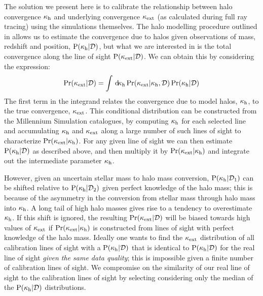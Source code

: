 \documentclass[useAMS,usenatbib]{mn2e}
\begin{document}
The solution we present here is to calibrate the relationship between halo
convergence $\kappa_{\rm h}$ and underlying convergence $\kappa_{\rm ext}$ (as calculated
during full ray tracing) using the simulations themselves.
The halo modelling procedure outlined in  allows 
us to estimate 
the convergence due to halos given observations of 
mass, redshift and position,
${\rm P}(\kappa_{\rm h}|\mathcal{D})$, but what we are interested in is the total convergence
along the line of sight ${\rm P}(\kappa_{\rm ext}|\mathcal{D})$. We can obtain this by
considering the expression:
\begin{equation}
\Pr(\kappa_{\rm ext}|\mathcal{D}) = \int \, \mathrm{d} \!\kappa_{\rm h} 
   \Pr(\kappa_{\rm ext}|\kappa_{\rm h},\mathcal{D}) \Pr(\kappa_{\rm h}|\mathcal{D})
\label{eq:kappaconv}   
\end{equation}
The first term in the integrand relates the convergence due to model halos,
$\kappa_{\rm h}$, to the true convergence, $\kappa_{\rm ext}$. This conditional distribution
can be constructed from the Millennium Simulation catalogues, by computing
$\kappa_{\rm h}$ for each selected line and accumulating $\kappa_{\rm h}$ and $\kappa_{\rm ext}$ along a large number of
such lines of
sight to  characterize $\Pr(\kappa_{\rm ext}|\kappa_{\rm h})$.
For any given line of sight we can then estimate
${\rm P}(\kappa_{\rm h}|{\mathcal{D}})$ as described above, and then
multiply it by $\Pr(\kappa_{\rm ext}|\kappa_{\rm h})$ and integrate out the intermediate
parameter $\kappa_{\rm h}$. 

However, given an uncertain stellar mass to halo mass conversion,
${\rm P}(\kappa_{\rm h}|\mathcal{D}_1)$ can be shifted relative to
${\rm P}(\kappa_{\rm h}|\mathcal{D}_2)$ given perfect knowledge of the halo mass; this is because of the asymmetry in the
conversion from stellar mass through halo mass into $\kappa_{\rm h}$. A long tail of
high halo masses gives rise to a tendency to overestimate $\kappa_{\rm h}$.
If this shift is ignored, the resulting $\Pr(\kappa_{\rm ext}|{\mathcal{D}})$ will be 
biased towards high values of $\kappa_{\rm ext}$ if $\Pr(\kappa_{\rm ext}|\kappa_{\rm h})$ is constructed from lines
of sight with perfect knowledge of the halo mass. Ideally one wants to find the $\kappa_{\rm ext}$ distribution
of all calibration lines of sight with a ${\rm P}(\kappa_{\rm h}|{\mathcal{D}})$ that is identical to ${\rm P}(\kappa_{\rm h}|{\mathcal{D}})$ for the real line of sight
{\it given the same data quality}; this is impossible given a finite number of calibration lines of sight.
We compromise on the similarity of our real line of sight to the calibration lines of sight by 
selecting considering only the median of the ${\rm P}(\kappa_{\rm h}|{\mathcal{D}})$ distributions.
\end{document}
